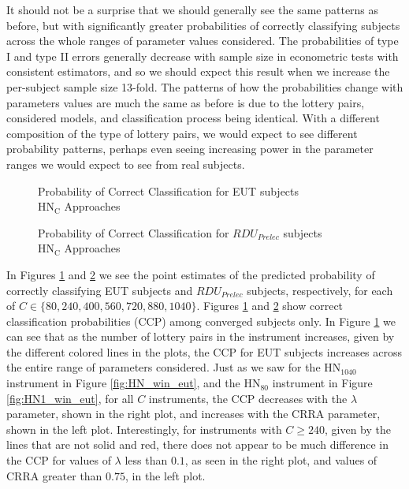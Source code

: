 \documentclass[../main.tex]{subfiles}
\begin{document}
It should not be a surprise that we should generally see the same patterns as before, but with significantly greater probabilities of correctly classifying subjects across the whole ranges of parameter values considered.
The probabilities of type I and type II errors generally decrease with sample size in econometric tests with consistent estimators, and so we should expect this result when we increase the per-subject sample size 13-fold.
The patterns of how the probabilities change with parameters values are much the same as before is due to the lottery pairs, considered models, and classification process being identical.
With a different composition of the type of lottery pairs, we would expect to see different probability patterns, perhaps even seeing increasing power in the parameter ranges we would expect to see from real subjects.

\begin{figure}[h!]
	\center
	\caption{Probability of Correct Classification for EUT subjects\\$\text{HN}_\text{C}$ Approaches}
	\label{fig:HNC_correct_eut}
\end{figure}

\begin{figure}[h!]
	\center
	\caption{Probability of Correct Classification for $\mathit{RDU_{Prelec}}$ subjects\\$\text{HN}_\text{C}$ Approaches}
	\label{fig:HNC_correct_pre}
\end{figure}

In Figures \ref{fig:HNC_correct_eut} and \ref{fig:HNC_correct_pre} we see the point estimates of the predicted probability of correctly classifying EUT subjects and $\mathit{RDU_{Prelec}}$ subjects, respectively, for each of $C \in \lbrace 80, 240, 400, 560, 720, 880, 1040 \rbrace$.
Figures \ref{fig:HNC_correct_eut} and \ref{fig:HNC_correct_pre} show correct classification probabilities (CCP) among converged subjects only.
In Figure \ref{fig:HNC_correct_eut} we can see that as the number of lottery pairs in the instrument increases, given by the different colored lines in the plots, the CCP for EUT subjects increases across the entire range of parameters considered.
Just as we saw for the $\text{HN}_{1040}$ instrument in Figure \ref{fig:HN_win_eut}, and the $\text{HN}_{80}$ instrument in Figure \ref{fig:HN1_win_eut}, for all $C$ instruments, the CCP decreases with the $\lambda$ parameter, shown in the right plot, and increases with the CRRA parameter, shown in the left plot.
Interestingly, for instruments with $C \geq 240$, given by the lines that are not solid and red, there does not appear to be much difference in the CCP for values of $\lambda$ less than $0.1$, as seen in the right plot, and values of CRRA greater than $0.75$, in the left plot.
\end{document}
